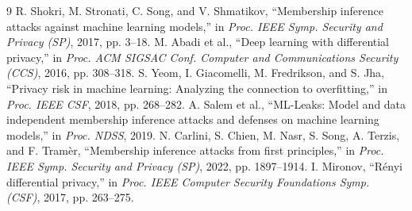 \documentclass[10pt,twocolumn]{article}
\begin{document}
\begin{thebibliography}{9}
\footnotesize
\setlength{\itemsep}{1pt}
 R. Shokri, M. Stronati, C. Song, and V. Shmatikov, ``Membership inference attacks against machine learning models,'' in \textit{Proc. IEEE Symp. Security and Privacy (SP)}, 2017, pp. 3--18.
 M. Abadi et al., ``Deep learning with differential privacy,'' in \textit{Proc. ACM SIGSAC Conf. Computer and Communications Security (CCS)}, 2016, pp. 308--318.
 S. Yeom, I. Giacomelli, M. Fredrikson, and S. Jha, ``Privacy risk in machine learning: Analyzing the connection to overfitting,'' in \textit{Proc. IEEE CSF}, 2018, pp. 268--282.
 A. Salem et al., ``ML-Leaks: Model and data independent membership inference attacks and defenses on machine learning models,'' in \textit{Proc. NDSS}, 2019.
 N. Carlini, S. Chien, M. Nasr, S. Song, A. Terzis, and F. Tram\`er, ``Membership inference attacks from first principles,'' in \textit{Proc. IEEE Symp. Security and Privacy (SP)}, 2022, pp. 1897--1914.
 I. Mironov, ``R\'enyi differential privacy,'' in \textit{Proc. IEEE Computer Security Foundations Symp. (CSF)}, 2017, pp. 263--275.
\end{thebibliography}
\end{document}
